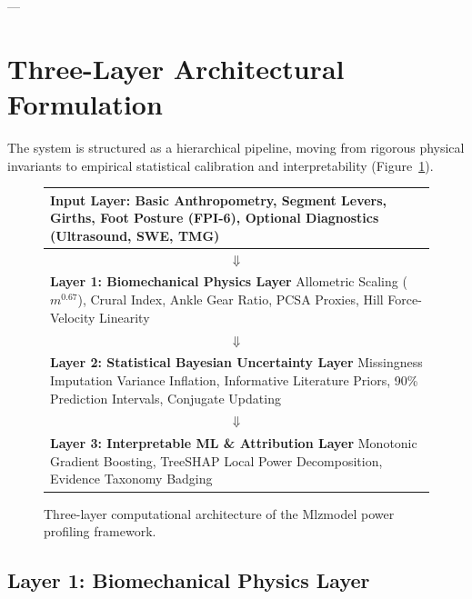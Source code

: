 \documentclass[11pt,a4paper]{article}
\begin{document}
---

\section{Three-Layer Architectural Formulation}

The system is structured as a hierarchical pipeline, moving from rigorous physical invariants to empirical statistical calibration and interpretability (Figure~\ref{fig:architecture}).

\begin{figure}[htbp]
\centering
\begin{tabular}{|p{14cm}|}
\hline
\textbf{Input Layer}: Basic Anthropometry, Segment Levers, Girths, Foot Posture (FPI-6), Optional Diagnostics (Ultrasound, SWE, TMG) \\
\hline
\multicolumn{1}{c}{$\Downarrow$} \\
\hline
\textbf{Layer 1: Biomechanical Physics Layer} \newline
Allometric Scaling ($m^{0.67}$), Crural Index, Ankle Gear Ratio, PCSA Proxies, Hill Force-Velocity Linearity \\
\hline
\multicolumn{1}{c}{$\Downarrow$} \\
\hline
\textbf{Layer 2: Statistical Bayesian Uncertainty Layer} \newline
Missingness Imputation Variance Inflation, Informative Literature Priors, 90\% Prediction Intervals, Conjugate Updating \\
\hline
\multicolumn{1}{c}{$\Downarrow$} \\
\hline
\textbf{Layer 3: Interpretable ML \& Attribution Layer} \newline
Monotonic Gradient Boosting, TreeSHAP Local Power Decomposition, Evidence Taxonomy Badging \\
\hline
\end{tabular}
\caption{Three-layer computational architecture of the Mlzmodel power profiling framework.}
\label{fig:architecture}
\end{figure}

\subsection{Layer 1: Biomechanical Physics Layer}
\end{document}
